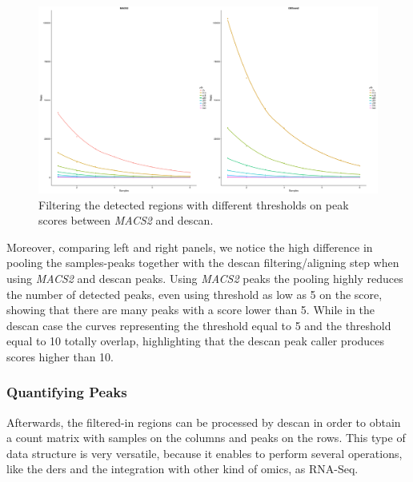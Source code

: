 \begin{figure}[H]
\includegraphics[width=\textwidth, height=\textheight, keepaspectratio]{img/descan2/filtering_m2_d2.png}
\caption[\gls{descan} and \textit{MACS2} filtering comparison]{Filtering the detected regions with different thresholds on peak scores between \textit{MACS2} and \gls{descan}.}
\label{fig:filteringdescanmacs2}
\centering
\end{figure}


Moreover, comparing left and right panels, we notice the high difference in pooling the samples-peaks together with the \gls{descan} filtering/aligning step when using \textit{MACS2} and \gls{descan} peaks.
Using \textit{MACS2} peaks the pooling highly reduces the number of detected peaks, even using threshold as low as 5 on the score, showing that there are many peaks with a score lower than 5.
While in the \gls{descan} case the curves representing the threshold equal to 5 and the threshold equal to 10 totally overlap, highlighting that the \gls{descan} peak caller produces scores higher than 10.


\subsubsection{Quantifying Peaks}

Afterwards, the filtered-in regions can be processed by \gls{descan} in order to obtain a count matrix with samples on the columns and peaks on the rows.
This type of data structure is very versatile, because it enables to perform several operations, like the \glspl{der} and the integration with other kind of omics, as RNA-Seq.

